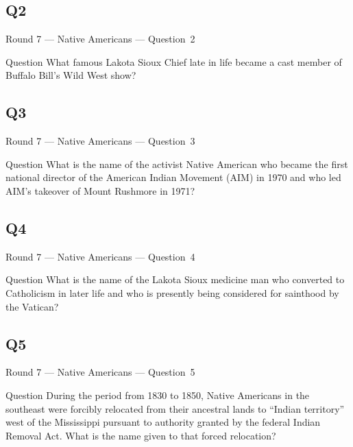 \documentclass[11pt]{beamer}
\begin{document}
\subsection*{Q2}
\begin{frame}[t]{Round 7 --- Native Americans --- \mbox{Question 2}}
\vspace{-0.5em}
\begin{block}{Question}
What famous Lakota Sioux Chief late in life became a cast member of Buffalo Bill's Wild West show?
\end{block}
\end{frame}
\subsection*{Q3}
\begin{frame}[t]{Round 7 --- Native Americans --- \mbox{Question 3}}
\vspace{-0.5em}
\begin{block}{Question}
What is the name of the activist Native American who became the first national director of the American Indian Movement (AIM) in 1970 and who led AIM's takeover of Mount Rushmore in 1971?
\end{block}
\end{frame}
\subsection*{Q4}
\begin{frame}[t]{Round 7 --- Native Americans --- \mbox{Question 4}}
\vspace{-0.5em}
\begin{block}{Question}
What is the name of the Lakota Sioux medicine man who converted to Catholicism in later life and who is presently being considered for sainthood by the Vatican?
\end{block}
\end{frame}
\subsection*{Q5}
\begin{frame}[t]{Round 7 --- Native Americans --- \mbox{Question 5}}
\vspace{-0.5em}
\begin{block}{Question}
During the period from 1830 to 1850, Native Americans in the southeast were forcibly relocated from their ancestral lands to ``Indian territory'' west of the Mississippi pursuant to authority granted by the federal Indian Removal Act.  What is the name given to that forced relocation?
\end{block}
\end{frame}
\end{document}
